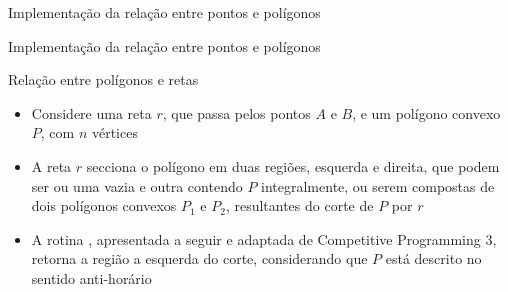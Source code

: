 \begin{frame}[fragile]{Implementação da relação entre pontos e polígonos}
\end{frame}

\begin{frame}[fragile]{Implementação da relação entre pontos e polígonos}
\end{frame}

\begin{frame}[fragile]{Relação entre polígonos e retas}

    \begin{itemize}
        \item Considere uma reta $r$, que passa pelos pontos $A$ e $B$, e um polígono convexo $P$, 
            com $n$ vértices
        \pause

        \item A reta $r$ secciona o polígono em duas regiões, esquerda e direita, que podem ser ou 
            uma vazia e outra contendo $P$ integralmente, ou serem compostas de dois polígonos 
            convexos $P_1$ e $P_2$, resultantes do corte de $P$ por $r$
        \pause

        \item A rotina , apresentada a seguir e adaptada de Competitive 
            Programming 3, retorna a região a esquerda do corte, considerando que $P$ está descrito 
            no sentido anti-horário
    \end{itemize}
        \pause

    \begin{figure}
        \centering

    \end{figure}

\end{frame}

